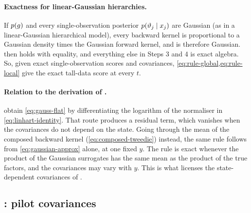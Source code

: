 \paragraph{Exactness for linear-Gaussian hierarchies.}
If $p(g)$ and every single-observation posterior $p(\vartheta_j\mid x_j)$ are Gaussian (as in a linear-Gaussian hierarchical model), every backward kernel is proportional to a Gaussian density times the Gaussian forward kernel, and is therefore Gaussian.
 then holds with equality, and everything else in Steps 3 and 4 is exact algebra.
So, given exact single-observation scores and covariances, \cref{eq:rule-global,eq:rule-local} give the exact tall-data score at every $t$.

\paragraph{Relation to the derivation of \citet{linhart2024diffusion}.}
\citet{linhart2024diffusion} obtain \cref{eq:gauss-flat} by differentiating the logarithm of the normaliser in \cref{eq:linhart-identity}.
That route produces a residual term, which vanishes when the covariances do not depend on the state.
Going through the mean of the composed backward kernel (\cref{eq:composed-tweedie}) instead, the same rule follows from \cref{eq:gaussian-approx} alone, at one fixed $y$.
The rule is exact whenever the product of the Gaussian surrogates has the same mean as the product of the true factors, and the covariances may vary with $y$.
This is what licenses the state-dependent covariances of \quiver.

\subsection{\arrowm: pilot covariances}\label{sec:arrow}

